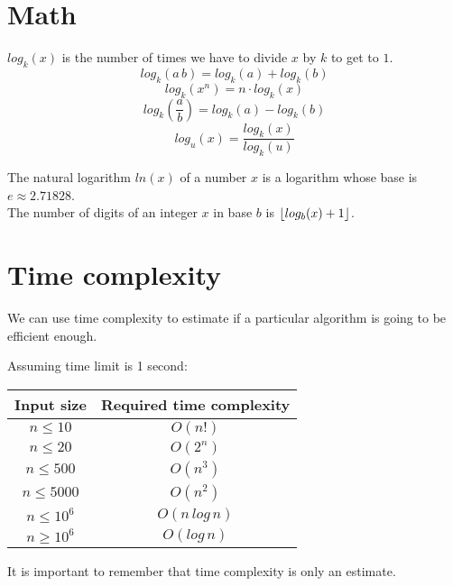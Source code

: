 \documentclass{article}
\DeclarePairedDelimiter\floor{\lfloor}{\rfloor}
\begin{document}
\section*{Math}

\(log_k(x)\) is the number of times we have to divide \(x\) by \(k\) to get to \(1\).
\[log_k(a \, b) = log_k(a) + log_k(b)\]
\[log_k(x^n) = n \cdot log_k(x)\]
\[log_k(\frac{a}{b}) = log_k(a) - log_k(b)\]
\[log_u(x) = \frac{log_k(x)}{log_k(u)}\]

The natural logarithm \(ln(x)\) of a number \(x\) is a logarithm whose base is \(e \approx 2.71828\).\\
The number of digits of an integer \(x\) in base \(b\) is \(\floor{log_b(x) + 1}\).

\section*{Time complexity}

We can use time complexity to estimate if a particular algorithm is going to be efficient enough.
\begin{center}
	Assuming time limit is 1 second:\\
	\vspace{1mm}
	\begin{tabular}{c|c}
		Input size & Required time complexity\\
		\hline
		\(n \leq 10\) & \(O(n!)\) \\
		\(n \leq 20\) & \(O(2^n)\) \\
		\(n \leq 500\) & \(O(n^3)\) \\
		\(n \leq 5000\) & \(O(n^2)\) \\
		\(n \leq 10^6\) & \(O(n\,log\,n)\) \\
		\(n \geq 10^6\) & \(O(log\,n)\) \\
	\end{tabular}
\end{center}
It is important to remember that time complexity is only an estimate.
\end{document}
